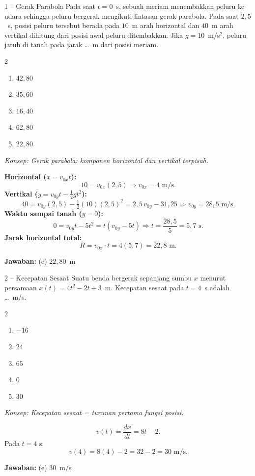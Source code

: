 \documentclass[11pt]{article}
\newcommand{\jawaban}[1]{%
  \noindent\colorbox{gold!30}{\parbox{\dimexpr\linewidth-2\fboxsep\relax}{%
    \textbf{Jawaban:} #1}}\par\smallskip}
\newcommand{\konsep}[1]{\textit{Konsep: #1.}\par\smallskip}
\newenvironment{pilB}{%
  \par\smallskip\begin{multicols}{2}
  \begin{enumerate}[label=(\alph*),leftmargin=*,itemsep=1pt,topsep=3pt]}%
  {\end{enumerate}\end{multicols}}
\begin{document}
\begin{soal}{1 -- Gerak Parabola}
Pada saat $t=0$~s, sebuah meriam menembakkan peluru ke udara sehingga peluru bergerak
mengikuti lintasan gerak parabola. Pada saat $2{,}5$~s, posisi peluru tersebut berada pada
$10$~m arah horizontal dan $40$~m arah vertikal dihitung dari posisi awal peluru
ditembakkan. Jika $g=10$~m/s$^2$, peluru jatuh di tanah pada jarak \ldots~m dari posisi meriam.
\begin{pilB}
  \item $42{,}80$ \item $35{,}60$ \item $16{,}40$ \item $62{,}80$ \item $22{,}80$
\end{pilB}
\end{soal}
\begin{pembox}
\konsep{Gerak parabola: komponen horizontal dan vertikal terpisah}
\textbf{Horizontal ($x=v_{0x}t$):}
\[
10 = v_{0x}(2{,}5) \Rightarrow v_{0x} = 4\text{ m/s}.
\]
\textbf{Vertikal ($y=v_{0y}t-\tfrac12gt^2$):}
\[
40 = v_{0y}(2{,}5) - \tfrac12(10)(2{,}5)^2 = 2{,}5\,v_{0y} - 31{,}25
\Rightarrow v_{0y} = 28{,}5\text{ m/s}.
\]
\textbf{Waktu sampai tanah ($y=0$):}
\[
0 = v_{0y}t - 5t^2 = t(v_{0y}-5t)
\Rightarrow t = \frac{28{,}5}{5} = 5{,}7\text{ s}.
\]
\textbf{Jarak horizontal total:}
\[
R = v_{0x}\cdot t = 4(5{,}7) = 22{,}8\text{ m}.
\]
\jawaban{(e) $22{,}80$~m}
\end{pembox}

\begin{soal}{2 -- Kecepatan Sesaat}
Suatu benda bergerak sepanjang sumbu $x$ menurut persamaan $x(t)=4t^2-2t+3$~m.
Kecepatan sesaat pada $t=4$~s adalah \ldots~m/s.
\begin{pilB}
  \item $-16$ \item $24$ \item $65$ \item $0$ \item $30$
\end{pilB}
\end{soal}
\begin{pembox}
\konsep{Kecepatan sesaat = turunan pertama fungsi posisi}
\[
v(t) = \frac{dx}{dt} = 8t - 2.
\]
Pada $t=4$ s:
\[
v(4) = 8(4) - 2 = 32 - 2 = 30\text{ m/s}.
\]
\jawaban{(e) $30$~m/s}
\end{pembox}
\end{document}
